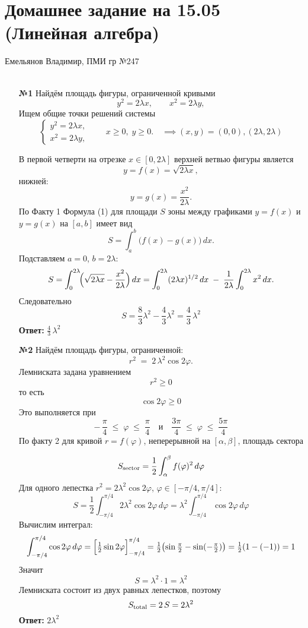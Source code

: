 \documentclass[a4paper]{article}
\begin{document}
\section*{Домашнее задание на 15.05 (Линейная алгебра)}
{\large Емельянов Владимир, ПМИ гр №247}\\\\
\begin{enumerate}
  \item[\textbf{№1}]
  Найдём площадь фигуры, ограниченной кривыми
  $$
  y^2 = 2\lambda x,
  \qquad
  x^2 = 2\lambda y,
  $$
  Ищем общие точки решений системы
  $$
  \begin{cases}
  y^2 = 2\lambda x,\\
  x^2 = 2\lambda y,
  \end{cases}
  \qquad x\ge0,\;y\ge0.
  \quad \implies (x, y) = (0, 0), (2\lambda, 2\lambda)$$
  
  В первой четверти на отрезке $x\in[0,2\lambda]$ верхней ветвью фигуры является
  $$
  y=f(x)=\sqrt{2\lambda x},
  $$
  нижней:
  $$
  y=g(x)=\frac{x^2}{2\lambda}.
  $$
  По Факту 1 Формула (1) для площади $S$ зоны между графиками $y=f(x)$ и $y=g(x)$ на $[a,b]$ имеет вид
  $$
  S=\int_a^b\bigl(f(x)-g(x)\bigr)\,dx.
  $$
  Подставляем $a=0$, $b=2\lambda$:
  $$
  S=\int_0^{2\lambda}\!\Bigl(\sqrt{2\lambda x}-\frac{x^2}{2\lambda}\Bigr)\,dx
  =\int_0^{2\lambda}(2\lambda x)^{1/2}\,dx\;-\;\frac1{2\lambda}\int_0^{2\lambda}x^2\,dx.
  $$
  Следовательно
  $$
  S=\frac{8}{3}\lambda^2-\frac{4}{3}\lambda^2
  =\frac{4}{3}\,\lambda^2
  $$
  \textbf{Ответ: }$\frac{4}{3}\,\lambda^2$\\

  \item[\textbf{№2}]
  Найдём площадь фигуры, ограниченной:
  $$
  r^2 \;=\; 2\,\lambda^2\cos2\varphi.
  $$
  Лемниската задана уравнением 
  $$r^2\ge0$$
  то есть 
  $$\cos2\varphi\ge0$$
  Это выполняется при
  $$
  -\,\frac\pi4\;\le\;\varphi\;\le\;\frac\pi4
  \quad\text{и}\quad
  \frac{3\pi}4\;\le\;\varphi\;\le\;\frac{5\pi}4
  $$
  По факту 2 для кривой $r=f(\varphi)$, непер­ерывной на $[\alpha,\beta]$, площадь сектора

  $$
  S_{\rm sector}
  =\frac12\int_{\alpha}^{\beta}f(\varphi)^2\,d\varphi
  $$
  Для одного лепестка \(r^2=2\lambda^2\cos2\varphi\), \(\varphi\in[-\pi/4,\pi/4]\):  
  $$
  S
  =\frac12\int_{-\pi/4}^{\pi/4}2\lambda^2\cos2\varphi\,d\varphi
  =\lambda^2\int_{-\pi/4}^{\pi/4}\cos2\varphi\,d\varphi
  $$
  Вычислим интеграл:
  $$
  \int_{-\pi/4}^{\pi/4}\cos2\varphi\,d\varphi
  =\Bigl[\tfrac12\sin2\varphi\Bigr]_{-\pi/4}^{\pi/4}
  =\tfrac12\bigl(\sin\tfrac\pi2-\sin(-\tfrac\pi2)\bigr)
  =\tfrac12(1-(-1))=1
  $$
  Значит
  $$
  S=\lambda^2\cdot1=\lambda^2
  $$
  Лемниската состоит из двух равных лепестков, поэтому
  $$
  S_{\rm total}=2\,S=2\lambda^2
  $$
  \textbf{Ответ: } $2\lambda^2$\\


\end{enumerate}
\end{document}
